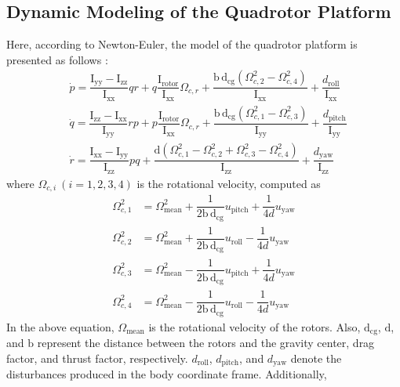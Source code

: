 \documentclass[peerreview]{IEEEtran}
\begin{document}
\subsection{Dynamic Modeling of the Quadrotor Platform}
\noindent Here, according to Newton-Euler, the model of the quadrotor platform is presented as follows \cite{4399042, article_Bouabdallah}:
\begin{align}
  &\dot p = \dfrac{\mathrm{I}_{\text{yy}} - \mathrm{I}_{\text{zz}}}
  {\mathrm{I}_{\text{xx}}} qr + q \dfrac{\mathrm{I}_{\text{rotor}}}
  {\mathrm{I}_{\text{xx}}}\Omega_{c, r} + \dfrac{\mathrm{b\,d}_{\text{cg}} (\Omega_{c, 2}^2 - \Omega_{c, 4}^2)}{\mathrm{I}
  _{\text{xx}}} + \dfrac{d_{\text{roll}}}{\mathrm{I}_{\text{xx}}}
  \\
  &\dot q = \dfrac{\mathrm{I}_{\text{zz}} - 
  \mathrm{I}_{\text{xx}}}{\mathrm{I}_{\text{yy}}} rp +
  p \dfrac{\mathrm{I}_{\text{rotor}}}{\mathrm{I}_{\text{xx}}}\Omega_{c, r} + 
  \dfrac{\mathrm{b\,d}_{\text{cg}} (\Omega_{c, 1}^2 - \Omega_{c, 3}^2)}{\mathrm{I}_{\text{yy}}} +
  \dfrac{d_{\text{pitch}}}{\mathrm{I}_{\text{yy}}}
  \\
  &\dot r = \dfrac{\mathrm{I}_{\text{xx}} -
  \mathrm{I}_{\text{yy}}}{\mathrm{I}_{\text{zz}}} pq 
  +  \dfrac{\mathrm{d} (\Omega_{c, 1}^2 - \Omega_{c, 2}^2 + \Omega_{c, 3}^2 - \Omega_{c, 4}^2)}{\mathrm{I}_{\text{zz}}} 
  + \dfrac{d_{\text{yaw}}}{\mathrm{I}_{\text{zz}}}
  \end{align}
  where $\Omega_{c, i}~(i=1, 2, 3, 4)$ is the rotational velocity, computed as
  \begin{align}
      \Omega_{c, 1}^2 &= \Omega_{\text{mean}}^2 + \dfrac{1}{2\mathrm{b\,d}_{\text{cg}}}u_{\text{pitch}} + \dfrac{1}{4d}u_{\text{yaw}} \\
      \Omega_{c, 2}^2 &= \Omega_{\text{mean}}^2 + \dfrac{1}{2\mathrm{b\,d}_{\text{cg}}}u_{\text{roll}} - \dfrac{1}{4d}u_{\text{yaw}}\\
      \Omega_{c, 3}^2 &= \Omega_{\text{mean}}^2 - \dfrac{1}{2\mathrm{b\,d}_{\text{cg}}}u_{\text{pitch}} + \dfrac{1}{4d}u_{\text{yaw}} \\
      \Omega_{c, 4}^2 &= \Omega_{\text{mean}}^2 - \dfrac{1}{2\mathrm{b\,d}_{\text{cg}}}u_{\text{roll}} - \dfrac{1}{4d}u_{\text{yaw}}
  \end{align}
  In the above equation, $\Omega_{\text{mean}}$ is the rotational velocity of the rotors. Also, $\mathrm{d}_{\text{cg}}$, $\text{d}$, and $\text{b}$ represent the distance between the rotors and the gravity center, drag factor, and thrust factor, respectively.
$d_{\text{roll}}$, $d_{\text{pitch}}$, and $d_{\text{yaw}}$ denote the disturbances produced in the body coordinate frame. Additionally,
\end{document}
